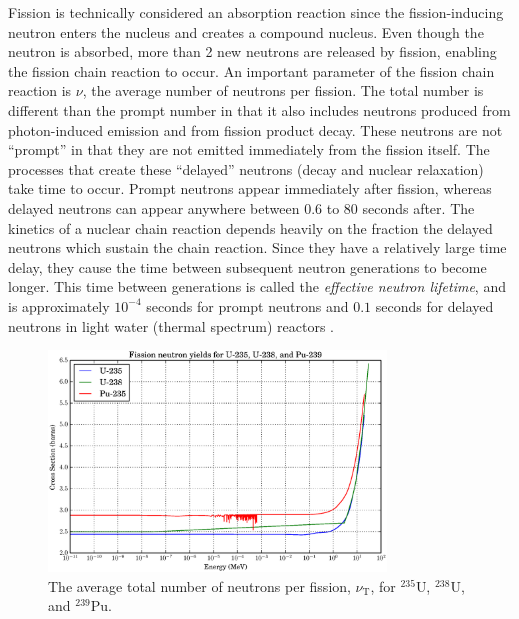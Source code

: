 Fission is technically considered an absorption reaction since the fission-inducing neutron enters the nucleus and creates a compound nucleus.  Even though the neutron is absorbed, more than 2 new neutrons are released by fission, enabling the fission chain reaction to occur.  An important parameter of the fission chain reaction is $\nu$, the average number of neutrons per fission.    The total number is different than the prompt number in that it also includes neutrons produced from photon-induced emission and from fission product decay.  These neutrons are not ``prompt'' in that they are not emitted immediately from the fission itself.  The processes that create these ``delayed'' neutrons (decay and nuclear relaxation) take time to occur.  Prompt neutrons appear immediately after fission, whereas delayed neutrons can appear anywhere between 0.6 to 80 seconds after.  The kinetics of a nuclear chain reaction depends heavily on the fraction the delayed neutrons which sustain the chain reaction.  Since they have a relatively large time delay, they cause the time between subsequent neutron generations to become longer.  This time between generations is called the \emph{effective neutron lifetime}, and is approximately $10^{-4}$ seconds for prompt neutrons and $0.1$ seconds for delayed neutrons in light water (thermal spectrum) reactors \cite{duderstadt}.  

\begin{figure}[h!]
  \centering
    \includegraphics[width=0.8\textwidth]{graphics/nu_compare.eps}
     \caption{The average total number of neutrons per fission, $\nu_\mathrm{T}$, for $^{235}$U, $^{238}$U, and $^{239}$Pu. \label{nu_compare}}
\end{figure}

